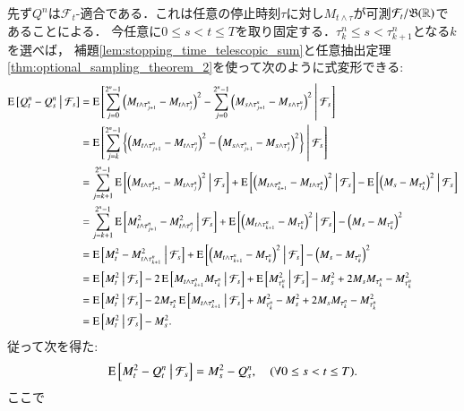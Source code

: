 	\begin{prf}
		先ず$Q^n$は$\mathcal{F}_t$-適合である．これは任意の停止時刻$\tau$に対し$M_{t \wedge \tau}$が可測$\mathcal{F}_t/\mathfrak{B}(\mathbb{R})$であることによる．
		今任意に$0 \leq s < t \leq T$を取り固定する．$\tau_k^n \leq s < \tau_{k+1}^n$となる$k$を選べば，
		補題\ref{lem:stopping_time_telescopic_sum}と任意抽出定理\ref{thm:optional_sampling_theorem_2}を使って次のように式変形できる:
		\begin{align}
			\operatorname{E} \left[ Q_t^n - Q_s^n \ \middle|\ \mathcal{F}_s \right] 
			&= \operatorname{E} \left[ \sum_{j=0}^{2^n-1}\left( M_{t\wedge\tau_{j+1}^n} - M_{t\wedge\tau_j^n} \right)^2 - \sum_{j=0}^{2^n-1}\left( M_{s\wedge\tau_{j+1}^n} - M_{s\wedge\tau_j^n} \right)^2 \ \middle|\ \mathcal{F}_s \right] \\
			&= \operatorname{E} \left[ \sum_{j=k}^{2^n-1}\left\{ \left( M_{t\wedge\tau_{j+1}^n} - M_{t\wedge\tau_j^n} \right)^2 - \left( M_{s\wedge\tau_{j+1}^n} - M_{s\wedge\tau_j^n} \right)^2 \right\} \ \middle|\ \mathcal{F}_s \right] \\
			&= \sum_{j=k+1}^{2^n-1} \operatorname{E} \left[ \left( M_{t\wedge\tau_{j+1}^n} - M_{t\wedge\tau_j^n} \right)^2 \ \middle|\ \mathcal{F}_s \right]
				+ \operatorname{E} \left[ \left( M_{t\wedge\tau_{k+1}^n} - M_{t\wedge\tau_k^n} \right)^2 \ \middle|\ \mathcal{F}_s \right] - \operatorname{E} \left[ \left( M_s - M_{\tau_k^n} \right)^2 \ \middle|\ \mathcal{F}_s \right] \\
			&= \sum_{j=k+1}^{2^n-1} \operatorname{E} \left[  M_{t\wedge\tau_{j+1}^n}^2 - M_{t\wedge\tau_j^n}^2 \ \middle|\ \mathcal{F}_s \right]
				+ \operatorname{E} \left[ \left( M_{t\wedge\tau_{k+1}^n} - M_{\tau_k^n} \right)^2 \ \middle|\ \mathcal{F}_s \right] - \left( M_s - M_{\tau_k^n} \right)^2 \\
			&= \operatorname{E} \left[  M_t^2 - M_{t\wedge\tau_{k+1}^n}^2 \ \middle|\ \mathcal{F}_s \right] + \operatorname{E} \left[ \left( M_{t\wedge\tau_{k+1}^n} - M_{\tau_k^n} \right)^2 \ \middle|\ \mathcal{F}_s \right] - \left( M_s - M_{\tau_k^n} \right)^2 \\
			&= \operatorname{E} \left[ M_t^2 \ \middle|\ \mathcal{F}_s \right] - 2\operatorname{E} \left[ M_{t\wedge\tau_{k+1}^n}M_{\tau_k^n} \ \middle|\ \mathcal{F}_s \right] + \operatorname{E} \left[ M_{\tau_k^n}^2 \ \middle|\ \mathcal{F}_s \right] - M_s^2 + 2M_sM_{\tau_k^n} - M_{\tau_k^n}^2 \\
			&= \operatorname{E} \left[ M_t^2 \ \middle|\ \mathcal{F}_s \right] - 2M_{\tau_k^n}\operatorname{E} \left[ M_{t\wedge\tau_{k+1}^n} \ \middle|\ \mathcal{F}_s \right] + M_{\tau_k^n}^2 - M_s^2 + 2M_sM_{\tau_k^n} - M_{\tau_k^n}^2 \\
			&= \operatorname{E} \left[ M_t^2 \ \middle|\ \mathcal{F}_s \right] - M_s^2.
		\end{align}
		従って次を得た:
		\begin{align}
			\operatorname{E} \left[ M_t^2 - Q_t^n \ \middle|\ \mathcal{F}_s \right] = M_s^2 - Q_s^n, \quad (\forall 0 \leq s < t \leq T).
			\label{eq:lem_quadratic_variation_1}
		\end{align}
		ここで
		\begin{align}

\end{align}
\end{prf}
